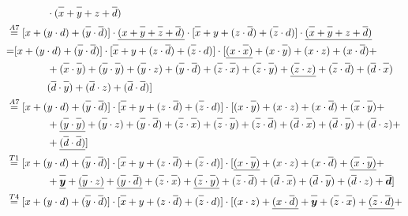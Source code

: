 \documentclass{article}
\newcommand*{\oline}[1]{\overline{#1\mathstrut}}
\newcommand{\bigspace}{\quad\quad\quad\quad}
\begin{document}
\begin{align*}
&\bigspace   \cdot (\oline{x}+\oline{y}+z+\oline{d})\\
&\overset{A7}{=}[x +  (y \cdot d)+  (\oline{y} \cdot \oline{d})] \cdot \underline{(x+\oline{y}+\oline{z}+\oline{d})}\cdot [\oline{x}+y+(z \cdot \oline{d})+ (\oline{z} \cdot d)]  \cdot \underline{(\oline{x}+\oline{y}+z+\oline{d})}\\
&{=} [x +  (y \cdot d)+  (\oline{y} \cdot \oline{d})] \cdot [\oline{x}+y+(z \cdot \oline{d})+ (\oline{z} \cdot d)]  \cdot [\underline{(x \cdot \oline{x})}+(x \cdot \oline{y})+(x  \cdot z)+ (x \cdot \oline{d}) + \\ 
&\bigspace +(\oline{x} \cdot \oline{y})+(\oline{y} \cdot \oline{y})+(\oline{y} \cdot z) + (\oline{y} \cdot \oline{d})+(\oline{z} \cdot \oline{x})+(\oline{z} \cdot \oline{y})+ \underline{(\oline{z} \cdot z)} + (\oline{z} \cdot \oline{d}) +(\oline{d} \cdot \oline{x}) \\
&\bigspace (\oline{d} \cdot \oline{y}) + (\oline{d} \cdot z) + (\oline{d} \cdot \oline{d})]\\
&\overset{A7}{=} [x +  (y \cdot d)+  (\oline{y} \cdot \oline{d})] \cdot [\oline{x}+y+(z \cdot \oline{d})+ (\oline{z} \cdot d)]  \cdot [(x \cdot \oline{y})+(x  \cdot z)+ (x \cdot \oline{d}) + (\oline{x} \cdot \oline{y})+ \\
&\bigspace +\underline{(\oline{y} \cdot \oline{y})}+(\oline{y} \cdot z) + (\oline{y} \cdot \oline{d})+(\oline{z} \cdot \oline{x})+(\oline{z} \cdot \oline{y})+ (\oline{z} \cdot \oline{d}) +(\oline{d} \cdot \oline{x}) + (\oline{d} \cdot \oline{y})  + (\oline{d} \cdot z) +\\
&\bigspace + \underline{(\oline{d} \cdot \oline{d})}] \\
&\overset{T1}{=}  [ x +  (y \cdot d)+  (\oline{y} \cdot \oline{d})] \cdot [\oline{x}+y+(z \cdot \oline{d})+ (\oline{z} \cdot d)]  \cdot [\underline{(x \cdot \oline{y})}+(x  \cdot z)+ (x \cdot \oline{d}) + \underline{(\oline{x} \cdot \oline{y})}+ \\
&\bigspace +\bm{\underline{\oline{y}}}+\underline{(\oline{y} \cdot z)} + \underline{(\oline{y} \cdot \oline{d})}+(\oline{z} \cdot \oline{x})+\underline{(\oline{z} \cdot \oline{y})}+ (\oline{z} \cdot \oline{d}) +(\oline{d} \cdot \oline{x}) + (\oline{d} \cdot \oline{y})  + (\oline{d} \cdot z) + \bm{\oline{d} }] \\
&\overset{T4}{=}  [x +  (y \cdot d)+  (\oline{y} \cdot \oline{d})] \cdot [\oline{x}+y+(z \cdot \oline{d})+ (\oline{z} \cdot d)]  \cdot [(x  \cdot z)+ \underline{(x \cdot \oline{d})} + \bm{\oline{y}} +(\oline{z} \cdot \oline{x})+ \underline{(\oline{z} \cdot \oline{d})} + \\

\end{align*}
\end{document}
